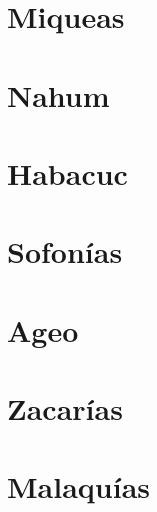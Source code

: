 \chapter{Miqueas}
\begin{multicols}{2}
  \raggedcolumns
  \parskip=0pt \relax
  
\end{multicols}

\chapter{Nahum}
\begin{multicols}{2}
  \raggedcolumns
  \parskip=0pt \relax
  
\end{multicols}

\chapter{Habacuc}
\begin{multicols}{2}
  \raggedcolumns
  \parskip=0pt \relax
  
\end{multicols}

\chapter{Sofonías}
\begin{multicols}{2}
  \raggedcolumns
  \parskip=0pt \relax
  
\end{multicols}

\chapter{Ageo}
\begin{multicols}{2}
  \raggedcolumns
  \parskip=0pt \relax
  
\end{multicols}

\chapter{Zacarías}
\begin{multicols}{2}
  \raggedcolumns
  \parskip=0pt \relax
  
\end{multicols}

\chapter{Malaquías}
\begin{multicols}{2}
  \raggedcolumns
  \parskip=0pt \relax
  
\end{multicols}

